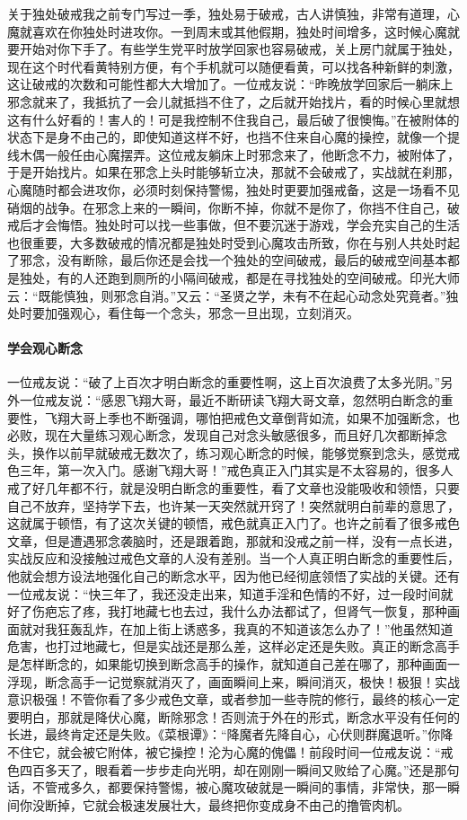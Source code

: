 关于独处破戒我之前专门写过一季，独处易于破戒，古人讲慎独，非常有道理，心魔就喜欢在你独处时进攻你。一到周末或其他假期，独处时间增多，这时候心魔就要开始对你下手了。有些学生党平时放学回家也容易破戒，关上房门就属于独处，现在这个时代看黄特别方便，有个手机就可以随便看黄，可以找各种新鲜的刺激，这让破戒的次数和可能性都大大增加了。一位戒友说：“昨晚放学回家后一躺床上邪念就来了，我抵抗了一会儿就抵挡不住了，之后就开始找片，看的时候心里就想这有什么好看的！害人的！可是我控制不住我自己，最后破了很懊悔。”在被附体的状态下是身不由己的，即使知道这样不好，也挡不住来自心魔的操控，就像一个提线木偶一般任由心魔摆弄。这位戒友躺床上时邪念来了，他断念不力，被附体了，于是开始找片。如果在邪念上头时能够斩立决，那就不会破戒了，实战就在刹那，心魔随时都会进攻你，必须时刻保持警惕，独处时更要加强戒备，这是一场看不见硝烟的战争。在邪念上来的一瞬间，你断不掉，你就不是你了，你挡不住自己，破戒后才会悔悟。独处时可以找一些事做，但不要沉迷于游戏，学会充实自己的生活也很重要，大多数破戒的情况都是独处时受到心魔攻击所致，你在与别人共处时起了邪念，没有断除，最后你还是会找一个独处的空间破戒，最后的破戒空间基本都是独处，有的人还跑到厕所的小隔间破戒，都是在寻找独处的空间破戒。印光大师云：“既能慎独，则邪念自消。”又云：“圣贤之学，未有不在起心动念处究竟者。”独处时要加强观心，看住每一个念头，邪念一旦出现，立刻消灭。

\paragraph{学会观心断念}

一位戒友说：“破了上百次才明白断念的重要性啊，这上百次浪费了太多光阴。”另外一位戒友说：“感恩飞翔大哥，最近不断研读飞翔大哥文章，忽然明白断念的重要性，飞翔大哥上季也不断强调，哪怕把戒色文章倒背如流，如果不加强断念，也必败，现在大量练习观心断念，发现自己对念头敏感很多，而且好几次都断掉念头，换作以前早就破戒无数次了，练习观心断念的时候，能够觉察到念头，感觉戒色三年，第一次入门。感谢飞翔大哥！”戒色真正入门其实是不太容易的，很多人戒了好几年都不行，就是没明白断念的重要性，看了文章也没能吸收和领悟，只要自己不放弃，坚持学下去，也许某一天突然就开窍了！突然就明白前辈的意思了，这就属于顿悟，有了这次关键的顿悟，戒色就真正入门了。也许之前看了很多戒色文章，但是遭遇邪念袭脑时，还是跟着跑，那就和没戒之前一样，没有一点长进，实战反应和没接触过戒色文章的人没有差别。当一个人真正明白断念的重要性后，他就会想方设法地强化自己的断念水平，因为他已经彻底领悟了实战的关键。还有一位戒友说：“快三年了，我还没走出来，知道手淫和色情的不好，过一段时间就好了伤疤忘了疼，我打地藏七也去过，我什么办法都试了，但肾气一恢复，那种画面就对我狂轰乱炸，在加上街上诱惑多，我真的不知道该怎么办了！”他虽然知道危害，也打过地藏七，但是实战还是那么差，这样必定还是失败。真正的断念高手是怎样断念的，如果能切换到断念高手的操作，就知道自己差在哪了，那种画面一浮现，断念高手一记觉察就消灭了，画面瞬间上来，瞬间消灭，极快！极狠！实战意识极强！不管你看了多少戒色文章，或者参加一些寺院的修行，最终的核心一定要明白，那就是降伏心魔，断除邪念！否则流于外在的形式，断念水平没有任何的长进，最终肯定还是失败。《菜根谭》：“降魔者先降自心，心伏则群魔退听。”你降不住它，就会被它附体，被它操控！沦为心魔的傀儡！前段时间一位戒友说：“戒色四百多天了，眼看着一步步走向光明，却在刚刚一瞬间又败给了心魔。”还是那句话，不管戒多久，都要保持警惕，被心魔攻破就是一瞬间的事情，非常快，那一瞬间你没断掉，它就会极速发展壮大，最终把你变成身不由己的撸管肉机。

